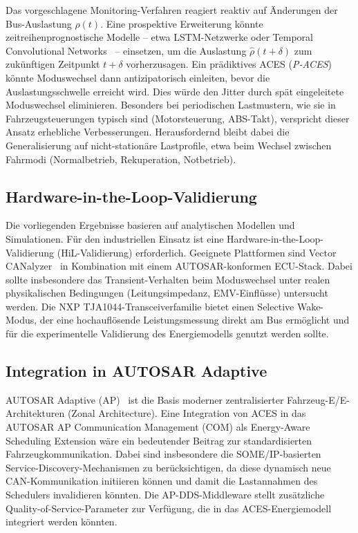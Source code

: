 ﻿\documentclass[a4paper,12pt]{article}
\theoremstyle{definition}
\begin{document}
Das vorgeschlagene Monitoring-Verfahren reagiert reaktiv auf \"{A}nderungen der
Bus-Auslastung $\rho(t)$.
Eine prospektive Erweiterung k\"{o}nnte zeitreihenprognostische Modelle -- etwa
LSTM-Netzwerke oder Temporal Convolutional Networks~\cite{bai_tcn} -- einsetzen,
um die Auslastung $\hat{\rho}(t + \delta)$ zum zuk\"{u}nftigen Zeitpunkt $t + \delta$
vorherzusagen.
Ein pr\"{a}diktives ACES (\emph{P-ACES}) k\"{o}nnte Moduswechsel dann antizipatorisch
einleiten, bevor die Auslastungsschwelle erreicht wird.
Dies w\"{u}rde den Jitter durch sp\"{a}t eingeleitete Moduswechsel eliminieren.
Besonders bei periodischen Lastmustern, wie sie in Fahrzeugsteuerungen typisch sind
(Motorsteuerung, ABS-Takt), verspricht dieser Ansatz erhebliche Verbesserungen.
Herausfordernd bleibt dabei die Generalisierung auf nicht-station\"{a}re
Lastprofile, etwa beim Wechsel zwischen Fahrmodi (Normalbetrieb, Rekuperation,
Notbetrieb).

\subsection{Hardware-in-the-Loop-Validierung}

Die vorliegenden Ergebnisse basieren auf analytischen Modellen und Simulationen.
F\"{u}r den industriellen Einsatz ist eine Hardware-in-the-Loop-Validierung
(HiL-Validierung) erforderlich.
Geeignete Plattformen sind Vector CANalyzer~\cite{vector_canalyzer} in Kombination
mit einem AUTOSAR-konformen ECU-Stack.
Dabei sollte insbesondere das Transient-Verhalten beim Moduswechsel unter realen
physikalischen Bedingungen (Leitungsimpedanz, EMV-Einfl\"{u}sse) untersucht werden.
Die NXP TJA1044-Transceiverfamilie bietet einen Selective Wake-Modus, der eine
hochaufl\"{o}sende Leistungsmessung direkt am Bus erm\"{o}glicht und f\"{u}r die
experimentelle Validierung des Energiemodells genutzt werden sollte.

\subsection{Integration in AUTOSAR Adaptive}

AUTOSAR Adaptive (AP)~\cite{autosar_adaptive} ist die Basis moderner
zentralisierter Fahrzeug-E/E-Architekturen (Zonal Architecture).
Eine Integration von ACES in das AUTOSAR AP Communication Management (COM)
als Energy-Aware Scheduling Extension w\"{a}re ein bedeutender Beitrag
zur standardisierten Fahrzeugkommunikation.
Dabei sind insbesondere die SOME/IP-basierten Service-Discovery-Mechanismen
zu ber\"{u}cksichtigen, da diese dynamisch neue CAN-Kommunikation initiieren k\"{o}nnen
und damit die Lastannahmen des Schedulers invalidieren k\"{o}nnten.
Die AP-DDS-Middleware stellt zus\"{a}tzliche Quality-of-Service-Parameter zur
Verf\"{u}gung, die in das ACES-Energiemodell integriert werden k\"{o}nnten.
\end{document}
